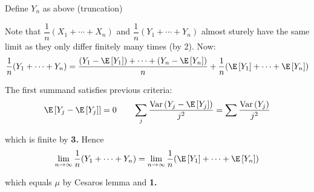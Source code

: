 \begin{prf}[]{}
  Define $Y_n$ as above (truncation)\par
  \noindent Note that $\dfrac{1}{n}(X_1+\cdots+X_n)$ and $\dfrac{1}{n}(Y_1+\cdots+Y_n)$ almost sturely have the same limit as they only differ finitely many times (by 2). Now:
  \begin{equation*}
    \begin{gathered}
      \dfrac{1}{n}(Y_1+\cdots+Y_n) = \dfrac{(Y_1-\E\left[Y_1\right])+\cdots+(Y_n-\E\left[Y_n\right])}{n} + \dfrac{1}{n}(\E\left[Y_1\right]+\cdots+\E\left[Y_n\right])
    \end{gathered}
  \end{equation*}\par
  \noindent The first summand satisfies previous criteria:
  \begin{equation*}
    \begin{gathered}
      \E\left[Y_j-\E\left[Y_j\right]\right] = 0\qquad\sum_j\dfrac{\text{Var}\left(Y_j-\E\left[Y_j\right]\right)}{j^2}= \sum\dfrac{\text{Var}\left(Y_j\right)}{j^2}
    \end{gathered}
  \end{equation*}\par
  \noindent which is finite by \textbf{3.} Hence
  \begin{equation*}
    \begin{gathered}
      \lim_{n\to\infty}\dfrac{1}{n}(Y_1+\cdots+Y_n) = \lim_{n\to\infty}\dfrac{1}{n}(\E\left[Y_1\right]+\cdots+\E\left[Y_n\right])
    \end{gathered}
  \end{equation*}\par
  \noindent which equals $\mu$ by Cesaros lemma and \textbf{1.}
\end{prf}
\par\bigskip
